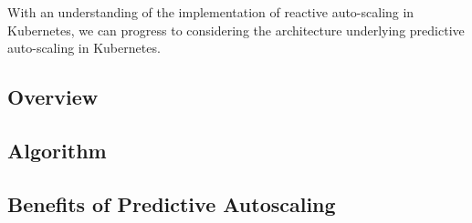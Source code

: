 With an understanding of the implementation of reactive auto-scaling in
Kubernetes, we can progress to considering the architecture underlying
predictive auto-scaling in Kubernetes.

\subsection{Overview}



\subsection{Algorithm}



\subsection{Benefits of Predictive Autoscaling}
\label{architecture-predictive-autoscaling-in-relation-to-kubernetes-benefits-of-predictive-autoscaling}


